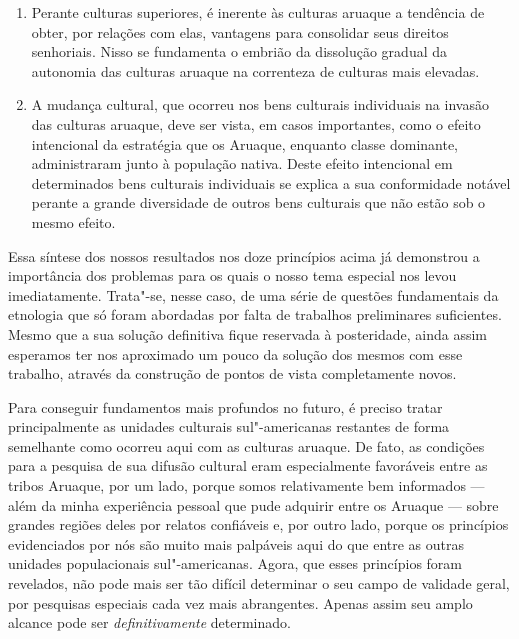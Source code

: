\begin{enumerate}
\item
  Perante culturas superiores, é inerente às culturas aruaque a
  tendência de obter, por relações com elas, vantagens para consolidar
  seus direitos senhoriais. Nisso se fundamenta o embrião da dissolução
  gradual da autonomia das culturas aruaque na correnteza de culturas
  mais elevadas.
\item
  A mudança cultural, que ocorreu nos bens culturais individuais na
  invasão das culturas aruaque, deve ser vista, em casos importantes,
  como o efeito intencional da estratégia que os Aruaque, enquanto
  classe dominante, administraram junto à população nativa. Deste
  efeito intencional em determinados bens culturais individuais se
  explica a sua conformidade notável perante a grande diversidade de
  outros bens culturais que não estão sob o mesmo efeito.
\end{enumerate}

Essa síntese dos nossos resultados nos doze princípios acima já
demonstrou a importância dos problemas para os quais o nosso tema
especial nos levou imediatamente. Trata"-se, nesse caso, de uma série de
questões fundamentais da etnologia que só foram abordadas por
falta de trabalhos preliminares suficientes. Mesmo que a sua solução
definitiva fique reservada à posteridade, ainda assim esperamos ter nos 
aproximado um pouco da solução dos mesmos com esse trabalho, através da
construção de pontos de vista completamente novos.

Para conseguir fundamentos mais profundos no futuro, é preciso tratar
principalmente as unidades culturais sul"-americanas restantes de forma
semelhante como ocorreu aqui com as culturas aruaque. De fato, as
condições para a pesquisa de sua difusão cultural eram especialmente
favoráveis entre as tribos Aruaque, por um lado, porque somos
relativamente bem informados --- além da minha experiência pessoal que
pude adquirir entre os Aruaque --- sobre grandes regiões deles por
relatos confiáveis e, por outro lado, porque os princípios evidenciados
por nós são muito mais palpáveis aqui do que entre as outras unidades
populacionais sul"-americanas. Agora, que esses princípios foram
revelados, não pode mais ser tão difícil determinar o seu campo de
validade geral, por pesquisas especiais cada vez mais abrangentes.
Apenas assim seu amplo alcance pode ser \textit{definitivamente} determinado.

